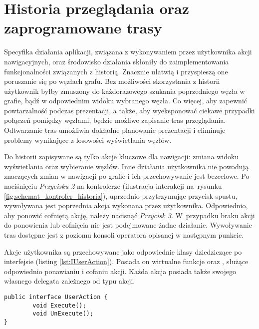 \section{Historia przeglądania oraz zaprogramowane trasy}
\label{sec:history}
Specyfika działania aplikacji, związana z wykonywaniem przez użytkownika akcji nawigacyjnych, oraz środowisko działania skłoniły do zaimplementowania funkcjonalności związanych z historią. Znacznie ułatwią i przyspieszą one poruszanie się po węzłach grafu. Bez możliwości skorzystania z historii użytkownik byłby zmuszony do każdorazowego szukania poprzedniego węzła w grafie, bądź w odpowiednim widoku wybranego węzła. Co więcej, aby zapewnić powtarzalność podczas prezentacji, a także, aby wyeksponować ciekawe przypadki połączeń pomiędzy węzłami, będzie możliwe zapisanie tras przeglądania. Odtwarzanie tras umożliwia dokładne planowanie prezentacji i eliminuje problemy wynikające z losowości wyświetlania węzłów. 

Do historii zapisywane są tylko akcje kluczowe dla nawigacji: zmiana widoku wyświetlania oraz wybieranie węzłów. Inne działania użytkownika nie powodują znaczących zmian w nawigacji po grafie i ich przechowywanie jest bezcelowe. Po naciśnięciu \textit{Przycisku 2} na kontrolerze (ilustracja interakcji na~rysunku \ref{fig:schemat_kontroler_historia}), uprzednio przytrzymując przycisk spustu, wywoływana jest poprzednia akcja wykonana przez użytkownika. Odpowiednio, aby ponowić cofniętą akcję, należy nacisnąć \textit{Przycisk 3}. W~przypadku braku akcji do ponowienia lub cofnięcia nie jest podejmowane żadne działanie. Wywoływanie tras dostępne jest z poziomu konsoli operatora opisanej w następnym punkcie.


Akcje użytkownika są przechowywane jako odpowiednie klasy dziedziczące po interfejsie\linebreak {} (listing \ref{lst:IUserAction}). Posiada on wirtualne funkcje  oraz , służące odpowiednio ponawianiu i cofaniu akcji. Każda akcja posiada także swojego własnego delegata zależnego od typu akcji. 

\begin{lstlisting}[caption={Interfejs \codeinline{UserAction}}, label=lst:IUserAction]
public interface UserAction {
		void Execute();
		void UnExecute();
}
\end{lstlisting}

